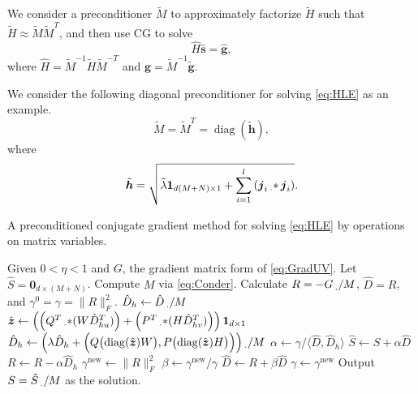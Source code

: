 \documentclass[11pt,twoside]{article}
\newcommand{\bsym}[1]{\ensuremath{\boldsymbol{#1}}}
\newcommand{\bj}{\ensuremath{\bsym{j}}}
\newcommand{\bz}{\ensuremath{\bsym{z}}}
\newcommand{\bs}{\ensuremath{\bsym{s}}}
\newcommand{\bg}{\ensuremath{\bsym{g}}}
\newcommand{\pointprod}[2]{\ensuremath{\left( #1 \operatorname{\prescript{}{\cdot}{\ast}} #2 \right)}}
\DeclareMathOperator*{\diag}{diag}
\begin{document}
We consider a preconditioner $\tilde{M}$ to approximately factorize $\tilde{H}$ such that $\tilde{H}\approx \tilde{M}\tilde{M}^T$, and then use CG to solve
\begin{equation}
    \hat{H} \hat{\bs}  = \hat{\bg},
    \label{eq:PcondSys}
\end{equation}
where $\hat{H}=\tilde{M}^{-1}\tilde{H}\tilde{M}^{-T}$ and $\hat{\bg}=\tilde{M}^{-1}\tilde{\bg}$.

We consider the following diagonal preconditioner for solving \eqref{eq:HLE} as an example.
\begin{equation}
    \tilde{M}=\tilde{M}^T=\diag(\tilde{\bsym{h}}),
    \label{eq:Conder}
\end{equation}
where
\begin{equation*}
    \tilde{\bsym{h}} = \sqrt{ \tilde{\lambda} \bsym{1}_{d(M+N) \times 1} + \sum_{i=1}^l \pointprod{\bj_i}{\bj_i} }.
\end{equation*}

\begin{algorithm}[t]
    \caption{A preconditioned conjugate gradient method for solving \eqref{eq:HLE} by operations on matrix variables.}
    \label{alg:Pcg}
    \begin{algorithmic}[1]
        \State Given $0<\eta<1$ and $G$, the gradient matrix form of \eqref{eq:GradUV}. Let $\hat{S}=\bsym{0}_{d\times (M+N)}$.
        \State Compute $M$ via \eqref{eq:Conder}.
        \State Calculate $R = -G \prescript{}{\cdot}{/} M$, $\hat{D}=R$, and $\gamma^0=\gamma=\|R\|_F^2$.
            \State $\hat{D}_h \gets \hat{D} \prescript{}{\cdot}{/} M$
            \State $\hat{\bz}\gets \left( \pointprod{Q^T}{(W\hat{D}_{hu}^T)}+\pointprod{P^T}{(H\hat{D}_{hv}^T)} \right) \bsym{1}_{d\times 1}$
            \State $\hat{D}_h \gets \left(\lambda \hat{D}_h + \Bigl ( Q \bigl(\diag(\hat{\bz}) W \bigr) , P \bigl ( \diag(\hat{\bz}) H \bigr) \Bigr)\right) \prescript{}{\cdot}{/} M$
            \State $\alpha \gets \gamma / \langle \hat{D},\hat{D}_h \rangle$
            \State $\hat{S} \gets\hat{S}+\alpha \hat{D}$
            \State $R \gets R-\alpha \hat{D}_h$
            \State $\gamma^{\text{new}} \gets \|R\|_F^2$
            \State $\beta \gets \gamma^{\text{new}}/\gamma$
            \State $\hat{D} \gets R+\beta \hat{D}$
            \State $\gamma \gets \gamma^{\text{new}}$
        \EndWhile
        \State Output $S=\hat{S} \prescript{}{\cdot}{/} M$ as the solution.
    \end{algorithmic}
\end{algorithm}

\clearpage\newpage


%
\end{document}
